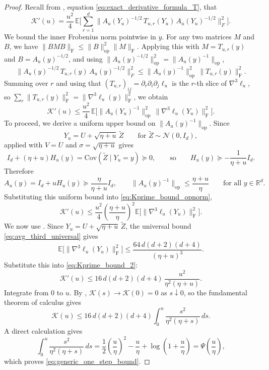 \documentclass[11pt]{article}
\def\E{\mathbb{E}}
\def\R{\mathbb{R}}
\newcommand{\Cov}{\mathrm{Cov}}
\newcommand{\opnorm}[1]{\|#1\|_{\mathrm{op}}}
\newcommand{\frobnorm}[1]{\|#1\|_{\mathrm{F}}}
\newcommand{\PsiFn}{\Psi}
\begin{document}
\begin{proof}
Recall from , equation \eqref{eq:exact_derivative_formula_T}, that
\[
\mathcal K'(u)
=
\frac{u^2}{4}\,\E\Big[\sum_{r=1}^d \big\|A_u(Y_u)^{-1/2}\,T_{u,r}(Y_u)\,A_u(Y_u)^{-1/2}\big\|_F^2\Big].
\]
We bound the inner Frobenius norm pointwise in \(y\). For any two matrices \(M\) and \(B\), we have \(\frobnorm{BMB}\le \opnorm{B}^2\frobnorm{M}\). Applying this with \(M=T_{u,r}(y)\) and \(B=A_u(y)^{-1/2}\), and using \(\opnorm{A_u(y)^{-1/2}}^2=\opnorm{A_u(y)^{-1}}\),
\[
\big\|A_u(y)^{-1/2}\,T_{u,r}(y)\,A_u(y)^{-1/2}\big\|_F^2
\le
\opnorm{A_u(y)^{-1}}^2\,\frobnorm{T_{u,r}(y)}^2.
\]
Summing over \(r\) and using that \((T_{u,r})_{ij}=\partial_r\partial_i\partial_j\ell_u\) is the \(r\)-th slice of \(\nabla^3\ell_u\), so \(\sum_r \frobnorm{T_{u,r}(y)}^2=\frobnorm{\nabla^3\ell_u(y)}^2\), we obtain
\begin{equation}
\label{eq:Kprime_bound_opnorm}
\mathcal K'(u)
\le
\frac{u^2}{4}\,\E\Big[\opnorm{A_u(Y_u)^{-1}}^2\,\frobnorm{\nabla^3\ell_u(Y_u)}^2\Big].
\end{equation} 
To proceed, we derive a uniform upper bound on \(\opnorm{A_u(y)^{-1}}\). Since
\[
Y_u = U + \sqrt{\eta+u}\,\widetilde Z
\qquad\text{for }\widetilde Z\sim\mathcal N(0,I_d),
\]
 applied with \(V=U\) and \(\sigma=\sqrt{\eta+u}\) gives
\[
I_d + (\eta+u)H_u(y) = \Cov(\widetilde Z\mid Y_u=y)\succeq 0,
\qquad\text{so}\qquad
H_u(y)\succeq -\frac{1}{\eta+u}I_d.
\]
Therefore
\[
A_u(y)=I_d+uH_u(y)\succeq \frac{\eta}{\eta+u}I_d,
\qquad
\opnorm{A_u(y)^{-1}}\le \frac{\eta+u}{\eta}
\qquad\text{for all }y\in\R^d.
\]
Substituting this uniform bound into \eqref{eq:Kprime_bound_opnorm},
\begin{equation}
\label{eq:Kprime_bound_2}
\mathcal K'(u)
\le
\frac{u^2}{4}\left(\frac{\eta+u}{\eta}\right)^2
\E\big[\frobnorm{\nabla^3\ell_u(Y_u)}^2\big].
\end{equation}
We now use . Since \(Y_u=U+\sqrt{\eta+u}\,\widetilde Z\), the universal bound \eqref{eq:avg_third_universal} gives
\[
\E\big[\frobnorm{\nabla^3\ell_u(Y_u)}^2\big]
\le
\frac{64\,d(d+2)(d+4)}{(\eta+u)^3}.
\]
Substitute this into \eqref{eq:Kprime_bound_2}:
\[
\mathcal K'(u)
\le
16\,d(d+2)(d+4)\,\frac{u^2}{\eta^2(\eta+u)}.
\]
Integrate from \(0\) to \(u\). By , \(\mathcal K(s)\to \mathcal K(0)=0\) as \(s\downarrow 0\), so the fundamental theorem of calculus gives
\[
\mathcal K(u)
\le
16\,d(d+2)(d+4)
\int_0^u \frac{s^2}{\eta^2(\eta+s)}\,ds.
\]
A direct calculation gives
\[
\int_0^u \frac{s^2}{\eta^2(\eta+s)}\,ds
=
\frac12\left(\frac{u}{\eta}\right)^2
-\frac{u}{\eta}
+\log\left(1+\frac{u}{\eta}\right)
=
\PsiFn\!\left(\frac{u}{\eta}\right),
\]
which proves \eqref{eq:generic_one_step_bound}.


\end{proof}
\end{document}
